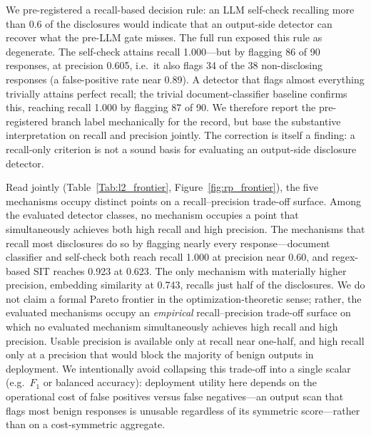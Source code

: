 \documentclass[journal]{IEEEtran}
\begin{document}
We pre-registered a recall-based decision rule: an LLM self-check recalling
more than 0.6 of the disclosures would indicate that an output-side detector can
recover what the pre-LLM gate misses. The full run exposed this rule as
degenerate. The self-check attains recall 1.000---but by flagging 86 of 90
responses, at precision 0.605, i.e.\ it also flags 34 of the 38 non-disclosing
responses (a false-positive rate near 0.89). A detector that flags almost
everything trivially attains perfect recall; the trivial document-classifier
baseline confirms this, reaching recall 1.000 by flagging 87 of 90. We therefore
report the pre-registered branch label mechanically for the record, but base the
substantive interpretation on recall and precision jointly. The correction is
itself a finding: a recall-only criterion is not a sound basis for evaluating an
output-side disclosure detector.

Read jointly (Table~\ref{Tab:l2_frontier}, Figure~\ref{fig:rp_frontier}), the
five mechanisms occupy distinct points on a recall--precision trade-off surface.
Among the evaluated detector classes, no mechanism occupies a point that
simultaneously achieves both high recall and high precision. The mechanisms that recall most disclosures
do so by flagging nearly every response---document classifier and self-check
both reach recall 1.000 at precision near 0.60, and regex-based SIT reaches
0.923 at 0.623. The only mechanism with materially higher precision, embedding
similarity at 0.743, recalls just half of the disclosures. We do not claim a
formal Pareto frontier in the optimization-theoretic sense; rather, the
evaluated mechanisms occupy an \emph{empirical} recall--precision trade-off
surface on which no evaluated mechanism simultaneously achieves high recall and
high precision. Usable precision is available only at recall near one-half, and
high recall only at a precision that would block the majority of benign outputs
in deployment. We intentionally avoid collapsing this trade-off into a single
scalar (e.g.\ $F_1$ or balanced accuracy): deployment utility here depends on
the operational cost of false positives versus false negatives---an output scan
that flags most benign responses is unusable regardless of its symmetric
score---rather than on a cost-symmetric aggregate.
\end{document}
